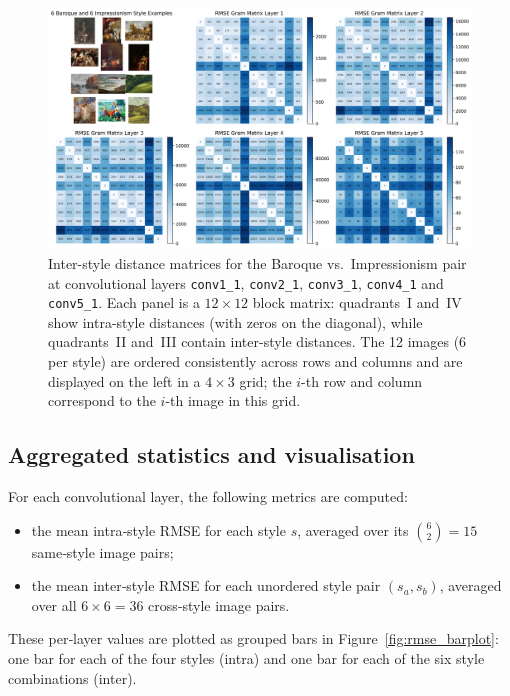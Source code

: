 \documentclass[a4paper,11pt]{article}
\begin{document}
\begin{figure}[ht]
  \centering
  \includegraphics[width=\textwidth]{figures/Baroque_Impressionism_RMSE.png}
  \caption{Inter-style distance matrices for the Baroque vs.\ Impressionism pair at convolutional layers \texttt{conv1\_1}, \texttt{conv2\_1}, \texttt{conv3\_1}, \texttt{conv4\_1} and \texttt{conv5\_1}. Each panel is a \(12\times12\) block matrix: quadrants~I and~IV show intra-style distances (with zeros on the diagonal), while quadrants~II and~III contain inter-style distances. The 12 images (6 per style) are ordered consistently across rows and columns and are displayed on the left in a $4\times3$ grid; the $i$-th row and column correspond to the $i$-th image in this grid.}
  \label{fig:rmse_inter}
\end{figure}

\subsection{Aggregated statistics and visualisation}
For each convolutional layer, the following metrics are computed:
\begin{itemize}
    \item the mean intra‐style RMSE for each style \(s\), averaged over its \(\binom{6}{2}=15\) same‐style image pairs;
    \item the mean inter‐style RMSE for each unordered style pair \((s_a,s_b)\), averaged over all \(6\times6=36\) cross‐style image pairs.
\end{itemize}
These per‐layer values are plotted as grouped bars in Figure~\ref{fig:rmse_barplot}: one bar for each of the four styles (intra) and one bar for each of the six style combinations (inter).
\end{document}
